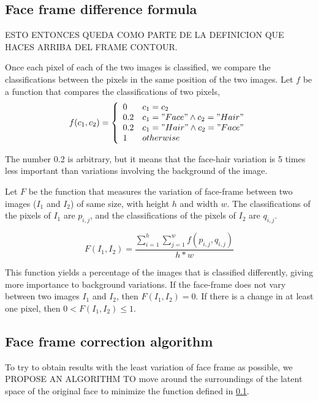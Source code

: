 \documentclass[review]{elsarticle}
\begin{document}
\subsection{Face frame difference formula}
\label{subsection:face_frame_difference_formula}

ESTO ENTONCES QUEDA COMO PARTE DE LA DEFINICION QUE HACES ARRIBA DEL FRAME CONTOUR.

Once each pixel of each of the two images is classified, we compare the classifications between the pixels in the same position of the two images. Let $f$ be a function that compares the classifications of two pixels,
\begin{equation}
f(c_1, c_2) = 
   \left\{
\begin{array}{ll}
      0 & c_1 = c_2 \\
      0.2 & c_1 = "Face" \land c_2 = "Hair" \\
      0.2 & c_1 = "Hair" \land c_2 = "Face" \\
      1 & otherwise \\
\end{array} 
\right. 
\end{equation}

The number 0.2 is arbitrary, but it means that the face-hair variation is 5 times less important than variations involving the background of the image.

Let $F$ be the function that measures the variation of face-frame between two images ($I_1$ and $I_2$) of same size, with height $h$ and width $w$. The classifications of the pixels of $I_1$ are $p_{i,j}$, and the classifications of the pixels of $I_2$ are $q_{i,j}$.

\begin{equation}
F(I_1, I_2) = \frac{\sum_{i=1}^{h} \sum_{j=1}^{w} f(p_{i,j}, q_{i,j})}{h*w}
\end{equation}

This function yields a percentage of the images that is classified differently, giving more importance to background variations. If the face-frame does not vary between two images $I_1$ and $I_2$, then $F(I_1, I_2)=0$. If there is a change in at least one pixel, then $0 < F(I_1, I_2) \leq 1$.

\subsection{Face frame correction algorithm}\label{subsection:face_frame_correction_algorithm}

To try to obtain results with the least variation of face frame as possible, we PROPOSE AN ALGORITHM TO move around the surroundings of the latent space of the original face to minimize the function defined in \ref{subsection:face_frame_difference_formula}. 
\end{document}
